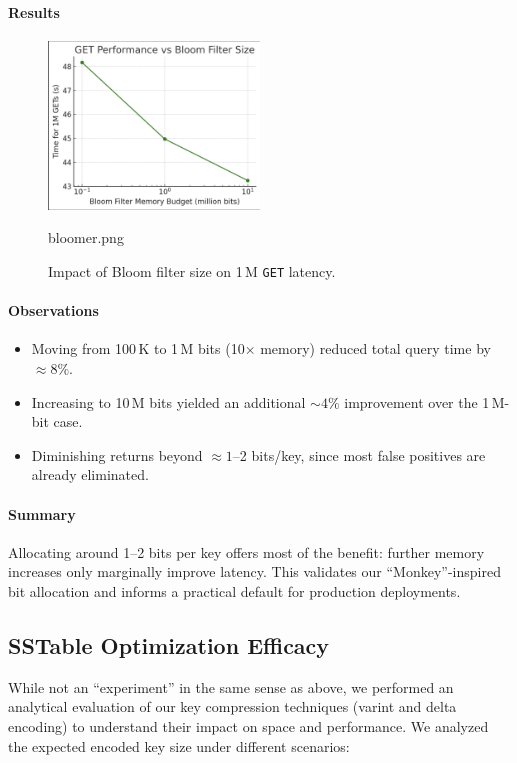 \documentclass[10pt]{article}
\begin{document}
\paragraph{Results}
\begin{figure}[htbp]
  \centering
  \includegraphics[width=0.5\textwidth]{bloomer.png}
  \caption{Impact of Bloom filter size on 1\,M \texttt{GET} latency.}
  \label{fig:bloom_tuning}bloomer.png
\end{figure}

\paragraph{Observations}
\begin{itemize}[itemsep=0.5ex]
  \item Moving from 100\,K to 1\,M bits (10× memory) reduced total query time by $\approx8\%$.
  \item Increasing to 10\,M bits yielded an additional $\sim4\%$ improvement over the 1\,M-bit case.
  \item Diminishing returns beyond \(\approx1\)–2 bits/key, since most false positives are already eliminated.
\end{itemize}

\paragraph{Summary}
Allocating around 1–2 bits per key offers most of the benefit: further memory increases only marginally improve latency. This validates our “Monkey”-inspired bit allocation and informs a practical default for production deployments.


\subsection{SSTable Optimization Efficacy}
While not an “experiment” in the same sense as above, we performed an analytical evaluation of our key compression techniques (varint and delta encoding) to understand their impact on space and performance. We analyzed the expected encoded key size under different scenarios:
\end{document}
